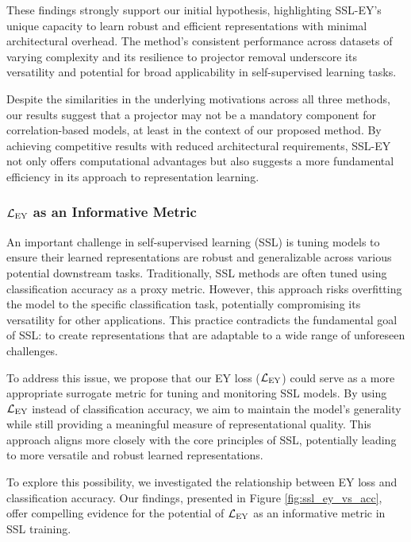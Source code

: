 These findings strongly support our initial hypothesis, highlighting SSL-EY's unique capacity to learn robust and efficient representations with minimal architectural overhead. The method's consistent performance across datasets of varying complexity and its resilience to projector removal underscore its versatility and potential for broad applicability in self-supervised learning tasks.

Despite the similarities in the underlying motivations across all three methods, our results suggest that a projector may not be a mandatory component for correlation-based models, at least in the context of our proposed method. By achieving competitive results with reduced architectural requirements, SSL-EY not only offers computational advantages but also suggests a more fundamental efficiency in its approach to representation learning.

\subsubsection{$\mathcal{L}_\text{EY}$ as an Informative Metric}
An important challenge in self-supervised learning (SSL) is tuning models to ensure their learned representations are robust and generalizable across various potential downstream tasks. Traditionally, SSL methods are often tuned using classification accuracy as a proxy metric. However, this approach risks overfitting the model to the specific classification task, potentially compromising its versatility for other applications. This practice contradicts the fundamental goal of SSL: to create representations that are adaptable to a wide range of unforeseen challenges.

To address this issue, we propose that our EY loss ($\mathcal{L}_\text{EY}$) could serve as a more appropriate surrogate metric for tuning and monitoring SSL models. By using $\mathcal{L}_\text{EY}$ instead of classification accuracy, we aim to maintain the model's generality while still providing a meaningful measure of representational quality. This approach aligns more closely with the core principles of SSL, potentially leading to more versatile and robust learned representations.

To explore this possibility, we investigated the relationship between EY loss and classification accuracy. Our findings, presented in Figure \ref{fig:ssl_ey_vs_acc}, offer compelling evidence for the potential of $\mathcal{L}_\text{EY}$ as an informative metric in SSL training.

